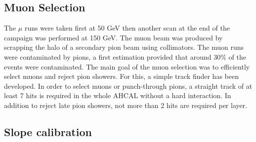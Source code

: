 \documentclass[twoside,a4paper,11pt]{article}
\begin{document}
\subsection{Muon Selection}

The $\mu$ runs were taken first at 50 GeV then another scan at the end of the campaign was performed at 150 GeV. The muon beam was produced by scrapping the halo of a secondary pion beam using collimators. The muon runs were contaminated by pions, a first estimation provided that around 30\% of the events were contaminated. The main goal of the muon selection was to efficiently select muons and reject pion showers. For this, a simple track finder has been developed. In order to select muons or punch-through pions, a straight track of at least 7 hits is required in the whole AHCAL without a hard interaction. In addition to reject late pion showers, not more than 2 hits are required per layer.

\subsection{Slope calibration}
\label{subsec:slope_calib}
\end{document}
